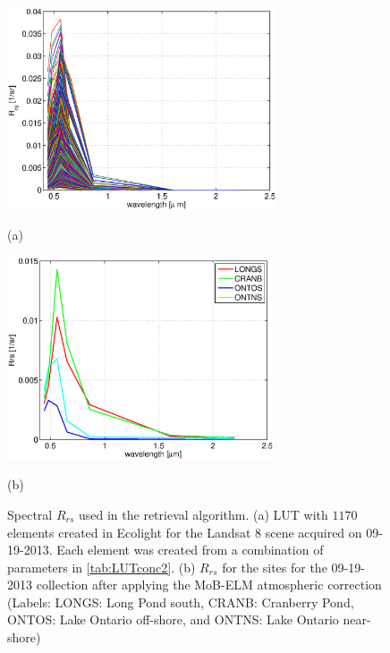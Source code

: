 \documentclass[onecolumn,3p,letterpaper]{elsarticle}
\begin{document}
\begin{figure}[htb]
  \begin{minipage}[c]{0.49\linewidth}
    \centering
      \includegraphics[height=6cm]{./Images/LUTsmart130919_150422.eps}
      \centerline{(a)}\medskip
  \end{minipage}  
  \hfill
  \begin{minipage}[d]{0.49\linewidth}
    \centering
      \includegraphics[height=6cm]{./Images/ROI130919_150422.eps}
      \centerline{(b)}\medskip
  \end{minipage} 

  \caption{Spectral $R_{rs}$ used in the retrieval algorithm. (a) LUT with $1170$ elements created in Ecolight for the Landsat 8 scene acquired on 09-19-2013. Each element was created from a combination of parameters in \autoref{tab:LUTconc2}. (b) $R_{rs}$ for the sites for the 09-19-2013 collection after applying the MoB-ELM atmospheric correction (Labels: LONGS: Long Pond south, CRANB: Cranberry Pond, ONTOS: Lake Ontario off-shore, and ONTNS: Lake Ontario near-shore)}
      \label{fig:Rrsused}
\end{figure}
\end{document}
